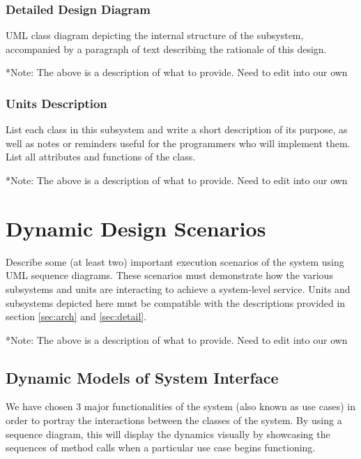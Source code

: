 \documentclass[12pt]{article}
\begin{document}
\subsubsection{Detailed Design Diagram}

UML class diagram depicting the internal structure of the subsystem,
accompanied by a paragraph of text describing the rationale of this design.

*Note: The above is a description of what to provide. Need to edit into our own




\subsubsection{Units Description}

List each class in this subsystem and write a short description of its purpose,
as well as notes or reminders useful for the programmers who will implement them.
List all attributes and functions of the class.

*Note: The above is a description of what to provide. Need to edit into our own

\section{Dynamic Design Scenarios} \label{Dynamic Models}

Describe some (at least two) important execution scenarios of the system using UML sequence diagrams.
These scenarios must demonstrate how the various subsystems and units are interacting to achieve a system-level service.
Units and subsystems depicted here must be compatible with the descriptions provided in
section \ref{sec:arch} and \ref{sec:detail}.

*Note: The above is a description of what to provide. Need to edit into our own


\subsection{Dynamic Models of System Interface}

We have chosen 3 major functionalities of the system (also known as use cases) in order to portray the interactions between the classes of the system. By using a sequence diagram, this will display the dynamics visually by showcasing the sequences of method calls when a particular use case begins functioning.

\clearpage
\end{document}
